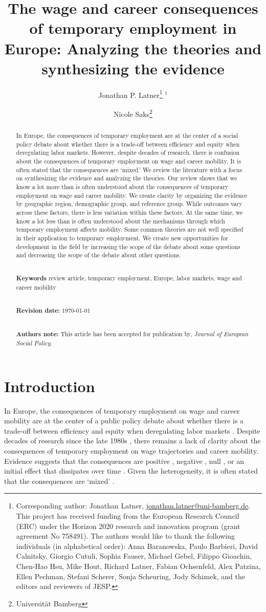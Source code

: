 \documentclass[12pt]{article}
\title{The wage and career consequences of temporary employment in Europe: Analyzing the theories and synthesizing the evidence}
\author{Jonathan P. Latner\footnote{Corresponding author: Jonathan Latner, \url{jonathan.latner@uni-bamberg.de}.  This project has received funding from the European Research Council (ERC) under the Horizon 2020 research and innovation program (grant agreement No 758491).  The authors would like to thank the following individuals (in alphabetical order):  Anna Baranowska, Paulo Barbieri, David Calnitsky, Giorgio Cutuli, Sophia Fauser, Michael Gebel, Filippo Gioachin, Chen-Hao Hsu, Mike Hout, Richard Latner, Fabian Ochsenfeld, Alex Patzina, Ellen Pechman, Stefani Scherer, Sonja Scheuring, Jody Schimek, and the editors and reviewers of JESP.} $^\dagger$ \and Nicole Saks\thanks{Universit{\"a}t Bamberg}}
\date{}
\begin{document}
\maketitle
\vspace{-.5cm}
\begin{abstract}

\noindent 
In Europe, the consequences of temporary employment are at the center of a social policy debate about whether there is a trade-off between efficiency and equity when deregulating labor markets.  However, despite decades of research, there is confusion about the consequences of temporary employment on wage and career mobility.  It is often stated that the consequences are `mixed.'  We review the literature with a focus on synthesizing the evidence and analyzing the theories.  Our review shows that we know a lot more than is often understood about the consequences of temporary employment on wage and career mobility.  We create clarity by organizing the evidence by geographic region, demographic group, and reference group.  While outcomes vary across these factors, there is less variation within these factors.  At the same time, we know a lot less than is often understood about the mechanisms through which temporary employment affects mobility.  Some common theories are not well specified in their application to temporary employment.  We create new opportunities for development in the field by increasing the scope of the debate about some questions and decreasing the scope of the debate about other questions.

\noindent
\\
{\bf Keywords} review article, temporary employment, Europe, labor markets, wage and career mobility

\noindent
\\
{\bf Revision date:} \today

\noindent
\\
{\bf Authors note:} This article has been accepted for publication by, \emph{Journal of European Social Policy}.
\end{abstract}


\clearpage
\doublespacing
\section{Introduction}

In Europe, the consequences of temporary employment on wage and career mobility are at the center of a public policy debate about whether there is a trade-off between efficiency and equity when deregulating labor markets \citep{jahn_etal_2012,muffels_2014}.  Despite decades of research since the late 1980s \citep{rodgers_rodgers_1989}, there remains a lack of clarity about the consequences of temporary employment on wage trajectories and career mobility.  Evidence suggests that the consequences are positive \citep{korpi_levin_2001},  negative \citep{giesecke_gross_2004}, null \citep{remery_etal_2002}, or an initial effect that dissipates over time \citep{gebel_2010}.  Given the heterogeneity, it is often stated that the consequences are `mixed' \citep{addison_2015,helbling_2017,mooi-reci_wooden_2017,reichenberg_berglund_2019,mcvicar_etal_2019}.  
\end{document}
